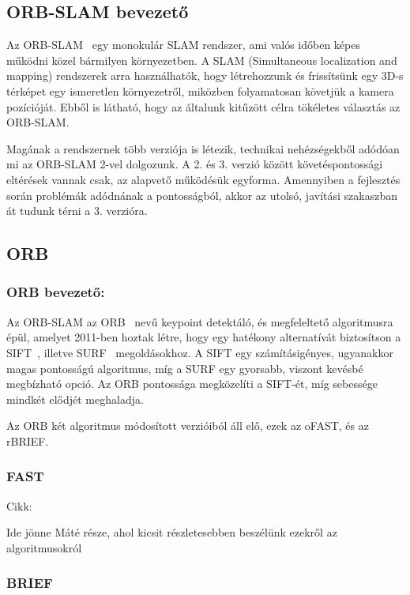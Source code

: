 \subsection{ORB-SLAM bevezető}

Az ORB-SLAM~\cite{7219438} egy monokulár SLAM rendszer, ami valós időben képes működni közel bármilyen környezetben. 
A SLAM (Simultaneous localization and mapping) rendszerek arra használhatók, hogy létrehozzunk és frissítsünk egy 3D-s térképet egy ismeretlen környezetről, miközben folyamatosan követjük a kamera pozícióját. 
Ebből is látható, hogy az általunk kitűzött célra tökéletes választás az ORB-SLAM.

Magának a rendszernek több verziója is létezik, technikai nehézségekből adódóan mi az ORB-SLAM 2-vel dolgozunk. 
A 2. és 3. verzió között követéspontossági eltérések vannak csak, az alapvető működésük egyforma. 
Amennyiben a fejlesztés során problémák adódnának a pontosságból, akkor az utolsó, javítási szakaszban át tudunk térni a 3. verzióra.

\subsection{ORB}

\subsubsection{ORB bevezető:}

Az ORB-SLAM az ORB~\cite{rublee2011orb} nevű keypoint detektáló, és megfeleltető algoritmusra épül, amelyet 2011-ben hoztak létre, hogy egy hatékony alternatívát biztosítson a SIFT~\cite{lowe2004distinctive}, illetve SURF~\cite{bay2006surf} megoldásokhoz.
A SIFT egy számításigényes, ugyanakkor magas pontosságú algoritmus, míg a SURF egy gyorsabb, viszont kevésbé megbízható opció.
Az ORB pontossága megközelíti a SIFT-ét, míg sebessége mindkét elődjét meghaladja.

Az ORB két algoritmus módosított verzióiból áll elő, ezek az oFAST, és az rBRIEF.

\subsubsection{FAST}

Cikk:\cite{rosten2006machine}

Ide jönne Máté része, ahol kicsit részletesebben beszélünk ezekről az algoritmusokról

\subsubsection{BRIEF}

